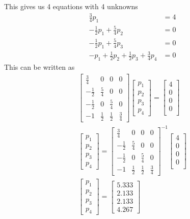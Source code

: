 \documentclass{article}
\begin{document}
  This gives us 4 equations with 4 unknowns
  \begin{align*}
	  \frac{3}{4}p_1 &= 4 \\
	  -\frac{1}{2}p_1+\frac{5}{4}p_2 &= 0 \\
	  -\frac{1}{2}p_1+\frac{5}{4}p_3 &= 0 \\
	   -p_1+\frac{1}{2}p_2+\frac{1}{2}p_3+\frac{3}{4}p_4 &= 0
  \end{align*}
  This can be written as 
  \begin{align*}
	  \begin{bmatrix}
		  \frac{3}{4} & 0 & 0 & 0 \\
		  -\frac{1}{2} & \frac{5}{4} & 0 & 0 \\
		  -\frac{1}{2} & 0 & \frac{5}{4} & 0 \\
		  -1 & \frac{1}{2} & \frac{1}{2} & \frac{3}{4}
          \end{bmatrix} 
	  \begin{bmatrix}
		  p_1 \\
		  p_2 \\
		  p_3 \\
		  p_4
	  \end{bmatrix} = 
	  \begin{bmatrix}
		  4 \\
		  0 \\
		  0 \\
		  0 \\
	  \end{bmatrix} \\
	  \begin{bmatrix}
		  p_1 \\
		  p_2 \\
		  p_3 \\
		  p_4
	  \end{bmatrix} = 
	  \begin{bmatrix}
		  \frac{3}{4} & 0 & 0 & 0 \\
		  -\frac{1}{2} & \frac{5}{4} & 0 & 0 \\
		  -\frac{1}{2} & 0 & \frac{5}{4} & 0 \\
		  -1 & \frac{1}{2} & \frac{1}{2} & \frac{3}{4}
	  \end{bmatrix}^{-1}
	  \begin{bmatrix}
		  4 \\
		  0 \\
		  0 \\
		  0 \\
	  \end{bmatrix} \\
	  \begin{bmatrix}
		  p_1 \\
		  p_2 \\
		  p_3 \\
		  p_4
	  \end{bmatrix} = 
	  \begin{bmatrix}
		  5.333 \\
		  2.133 \\
		  2.133 \\
		  4.267 
	  \end{bmatrix}
  \end{align*}
\end{document}
